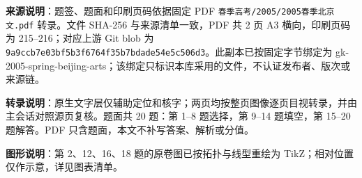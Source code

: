 

\begin{gktip}
\textbf{来源说明}：题签、题面和印刷页码依据固定 PDF \texttt{春季高考/2005/2005春季北京文.pdf} 转录。文件 SHA-256 与来源清单一致，PDF 共 2 页 A3 横向，印刷页码为 215–216；对应上游 Git blob 为 \texttt{9a9ccb7e03bf5b3f6764f35b7bdade54e5c506d3}。此副本已按固定字节绑定为 gk-2005-spring-beijing-arts；该绑定只标识本库采用的文件，不认证发布者、版次或来源链。

\textbf{转录说明}：原生文字层仅辅助定位和核字；两页均按整页图像逐页目视转录，并由主会话对照源页复核。题面共 20 题：第 1–8 题选择，第 9–14 题填空，第 15–20 题解答。PDF 只含题面，本文不补写答案、解析或分值。

\textbf{图形说明}：第 2、12、16、18 题的原卷图已按拓扑与线型重绘为 TikZ；相对位置仅作示意，详见图表清单。
\end{gktip}


